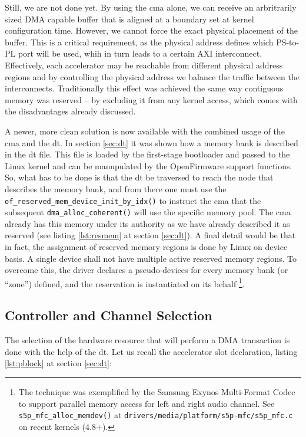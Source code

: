 Still, we are not done yet. By using the \gls{cma} alone, we can receive an
arbritrarily sized DMA capable buffer that is aligned at a boundary set at kernel configuration time.
However, we cannot force the exact physical placement of the buffer.
This is a critical requirement, as the physical address defines which PS-to-PL port will be used,
whih in turn leads to a certain AXI interconnect. Effectively, each accelerator may be
reachable from different physical address regions and by controlling the physical address
we balance the traffic between the interconnects. Traditionally this effect was achieved
the same way contiguous memory was reserved -- by excluding it from any kernel access,
which comes with the disadvantages already discussed. 

A newer, more clean solution is now available
with the combined usage of the \gls{cma} and the \gls{dt}.
In section \ref{sec:dt} it was shown how a memory bank is described in the \gls{dt} file.
This file is loaded by the first-stage bootloader and passed to the Linux kernel
and can be manupulated by the OpenFirmware support functions. So, what has to be done
is that the \gls{dt} be traversed to reach the node that describes the memory bank,
and from there one must use the \texttt{of\_reserved\_mem\_device\_init\_by\_idx()}
to instruct the \gls{cma} that the subsequent \texttt{dma\_alloc\_coherent()} will
use the specific memory pool. The \gls{cma} already has this memory under its
authority as we have already described it as reserved (see listing \ref{lst:resmem} at section \ref{sec:dt}).
A final detail would be that in fact, the assignment of reserved memory regions is
done by Linux on device basis. A single device shall not have multiple active
reserved memory regions. To overcome this, the driver declares a pseudo-devices
for every memory bank (or ``zone'') defined, and the reservation is instantiated on its behalf
\footnote{The technique was exemplified by the Samsung Exynos Multi-Format Codec to support
parallel memory access for left and right audio channel. See \texttt{s5p\_mfc\_alloc\_memdev()}
at \texttt{drivers/media/platform/s5p-mfc/s5p\_mfc.c} on recent kernels (4.8+).}.

\subsection{Controller and Channel Selection}

The selection of the hardware resource that will perform a DMA transaction is done
with the help of the \gls{dt}. Let us recall the accelerator slot declaration,
listing \ref{lst:pblock} at section \ref{sec:dt}:


